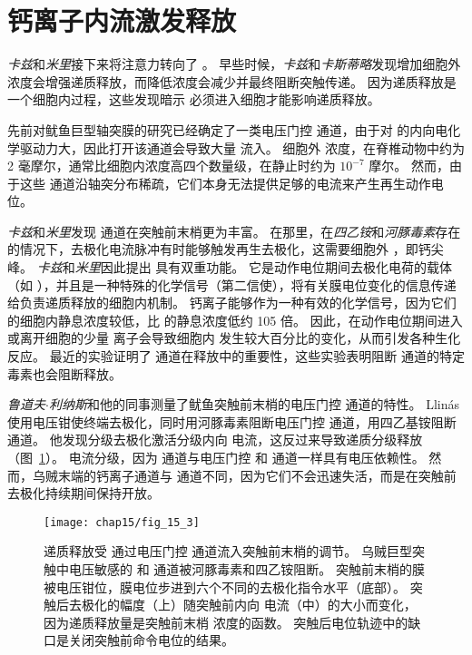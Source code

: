 \section{钙离子内流激发释放}

\textit{卡兹}和\textit{米里}接下来将注意力转向了 。
早些时候，\textit{卡兹}和\textit{卡斯蒂略}发现增加细胞外  浓度会增强递质释放，而降低浓度会减少并最终阻断突触传递。
因为递质释放是一个细胞内过程，这些发现暗示  必须进入细胞才能影响递质释放。


先前对鱿鱼巨型轴突膜的研究已经确定了一类电压门控  通道，由于对  的内向电化学驱动力大，因此打开该通道会导致大量  流入。
细胞外  浓度，在脊椎动物中约为 2 毫摩尔，通常比细胞内浓度高四个数量级，在静止时约为 $10^{-7}$ 摩尔。
然而，由于这些  通道沿轴突分布稀疏，它们本身无法提供足够的电流来产生再生动作电位。


\textit{卡兹}和\textit{米里}发现  通道在突触前末梢更为丰富。
在那里，在\textit{四乙铵}和\textit{河豚毒素}存在的情况下，去极化电流脉冲有时能够触发再生去极化，这需要细胞外 ，即钙尖峰。
\textit{卡兹}和\textit{米里}因此提出  具有双重功能。
它是动作电位期间去极化电荷的载体（如 ），并且是一种特殊的化学信号（第二信使），将有关膜电位变化的信息传递给负责递质释放的细胞内机制。
钙离子能够作为一种有效的化学信号，因为它们的细胞内静息浓度较低，比  的静息浓度低约 105 倍。
因此，在动作电位期间进入或离开细胞的少量  离子会导致细胞内  发生较大百分比的变化，从而引发各种生化反应。
最近的实验证明了  通道在释放中的重要性，这些实验表明阻断  通道的特定毒素也会阻断释放。


\textit{鲁道夫$\cdot$利纳斯}和他的同事测量了鱿鱼突触前末梢的电压门控  通道的特性。
Llinás 使用电压钳使终端去极化，同时用河豚毒素阻断电压门控  通道，用四乙基铵阻断  通道。
他发现分级去极化激活分级内向  电流，这反过来导致递质分级释放（图~\ref{fig:15_3}）。
 电流分级，因为  通道与电压门控  和  通道一样具有电压依赖性。
然而，乌贼末端的钙离子通道与  通道不同，因为它们不会迅速失活，而是在突触前去极化持续期间保持开放。


\begin{figure}[htbp]
	\centering
	\texttt{[image: chap15/fig\_15\_3]}
	\caption{递质释放受  通过电压门控  通道流入突触前末梢的调节。
	乌贼巨型突触中电压敏感的  和  通道被河豚毒素和四乙铵阻断。
	突触前末梢的膜被电压钳位，膜电位步进到六个不同的去极化指令水平（底部）。
	突触后去极化的幅度（上）随突触前内向  电流（中）的大小而变化，因为递质释放量是突触前末梢  浓度的函数。
	突触后电位轨迹中的缺口是关闭突触前命令电位的结果\cite{llinas1977depolarization}。}
	\label{fig:15_3}
\end{figure}


